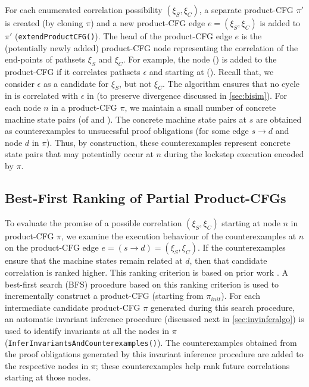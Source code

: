 For each enumerated correlation possibility $(\xi_S,\xi_C)$, a separate product-CFG $\pi'$ is
created (by cloning $\pi$) and a new product-CFG edge $e=(\xi_S,\xi_C)$ is added to $\pi'$ ({\tt extendProductCFG()}).
The head of the product-CFG edge $e$ is the (potentially newly added) product-CFG node representing
the correlation of the end-points of pathsets $\xi_S$ and $\xi_C$. For example, the node () is added
to the product-CFG if it correlates pathsets $\epsilon$ and  starting at ().
Recall that, we consider $\epsilon$ as a candidate for $\xi_S$, but not $\xi_C$.
The algorithm ensures that no cycle in \cprog{} is correlated with $\epsilon$ in \sprog{}
(to preserve divergence discussed in \cref{sec:bisim}).
For each node $n$ in a product-CFG $\pi$, we maintain a small number of
concrete machine state pairs (of \sprog{} and \cprog{}).
The concrete machine state pairs at $s$ are obtained as counterexamples to unsucessful proof
obligations  (for some edge $s \rightarrow d$ and node $d$ in $\pi$).
Thus, by construction, these counterexamples represent concrete state pairs that may potentially occur
at $n$ during the lockstep execution encoded by $\pi$.

\subsection{Best-First Ranking of Partial Product-CFGs}
\label{sec:rankproductcfg}
To evaluate the promise of a possible correlation $(\xi_S,\xi_C)$ starting at node $n$
in product-CFG $\pi$, we examine the execution behaviour of the counterexamples at $n$ on
the product-CFG edge $e=(s\rightarrow d)=(\xi_S,\xi_C)$.
If the counterexamples ensure that the machine states remain related at $d$,
then that candidate correlation is ranked higher.
This ranking criterion is based on prior work \cite{oopsla20}.
A best-first search (BFS) procedure based on this ranking criterion is used to incrementally construct
a product-CFG (starting from $\pi_{init}$).
For each intermediate candidate product-CFG $\pi$ generated during this search procedure,
an automatic invariant inference procedure (discussed next in \cref{sec:invinferalgo}) is
used to identify invariants at all the nodes in $\pi$ ({\tt InferInvariantsAndCounterexamples()}).
The counterexamples obtained from the proof obligations generated by this invariant inference
procedure are added to the respective nodes in $\pi$; these counterexamples help rank
future correlations starting at those nodes.

